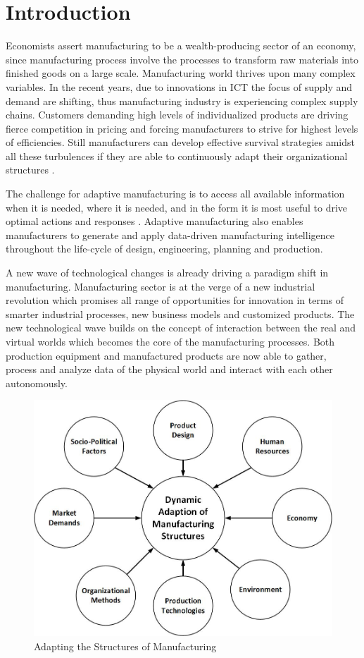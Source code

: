 \chapter{Introduction} \label{chap:introduction}Economists assert manufacturing to be a wealth-producing sector of an economy, since manufacturing process involve the processes to transform raw materials into finished goods on a large scale. Manufacturing world thrives upon many complex variables. In the recent years, due to innovations in \acs{ICT} the focus of supply and demand are shifting, thus manufacturing industry is experiencing complex supply chains. Customers demanding high levels of individualized products are driving fierce competition in pricing and forcing manufacturers to strive for highest levels of efficiencies. Still manufacturers can develop effective survival strategies amidst all these turbulences  if they are able to continuously adapt their organizational structures \cite{WESTKAMP}.

The challenge for adaptive manufacturing is to access all available information when it is needed, where it is needed, and in the form it is most useful to drive optimal actions and responses . Adaptive manufacturing also enables manufacturers to generate and apply data-driven manufacturing intelligence throughout the life-cycle of design, engineering, planning and production.

A new wave of technological changes  is already driving a paradigm shift in manufacturing. Manufacturing sector is at the verge of a new industrial revolution which promises all range of opportunities for innovation in terms of smarter industrial processes, new business models and customized products. The new technological wave builds on the concept of interaction between the real and virtual worlds which becomes the core of the manufacturing processes. Both production equipment and manufactured products are now able to gather, process and analyze data of the physical world and interact with each other autonomously.
\begin{figure}[h!]
	\includegraphics[scale=0.4]{./gfx/addmanustr}
	\centering
	\caption{Adapting the Structures of Manufacturing \cite{WESTKAMP}}
	\label{fig:1.1}
\end{figure}

